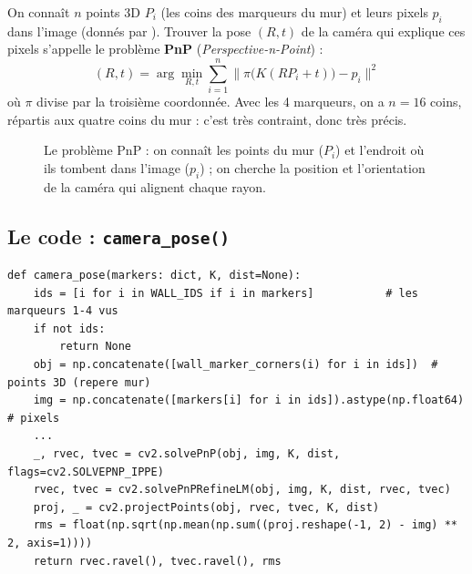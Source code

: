\documentclass[11pt,a4paper]{article}
\newcommand{\code}[1]{\texttt{\detokenize{#1}}}
\begin{document}
On connaît $n$ points 3D $P_i$ (les coins des marqueurs du mur) et leurs pixels $p_i$ dans l'image (donnés par
\code{detect()}). Trouver la pose $(R,t)$ de la caméra qui explique ces pixels s'appelle le problème
\textbf{PnP} (\emph{Perspective-n-Point}) :
\[
  (R, t) = \arg\min_{R,t} \sum_{i=1}^{n} \bigl\| \pi\bigl(K (R P_i + t)\bigr) - p_i \bigr\|^2
\]
où $\pi$ divise par la troisième coordonnée. Avec les 4 marqueurs, on a $n = 16$ coins, répartis aux quatre
coins du mur : c'est très contraint, donc très précis.

\begin{figure}[H]
\centering
{}
\caption{Le problème PnP : on connaît les points du mur ($P_i$) et l'endroit où ils tombent dans l'image
($p_i$) ; on cherche la position et l'orientation de la caméra qui alignent chaque rayon.}
\end{figure}

\subsection{Le code : \texttt{camera\_pose()}}

\begin{lstlisting}[style=py]
def camera_pose(markers: dict, K, dist=None):
    ids = [i for i in WALL_IDS if i in markers]           # les marqueurs 1-4 vus
    if not ids:
        return None
    obj = np.concatenate([wall_marker_corners(i) for i in ids])  # points 3D (repere mur)
    img = np.concatenate([markers[i] for i in ids]).astype(np.float64)  # pixels
    ...
    _, rvec, tvec = cv2.solvePnP(obj, img, K, dist, flags=cv2.SOLVEPNP_IPPE)
    rvec, tvec = cv2.solvePnPRefineLM(obj, img, K, dist, rvec, tvec)
    proj, _ = cv2.projectPoints(obj, rvec, tvec, K, dist)
    rms = float(np.sqrt(np.mean(np.sum((proj.reshape(-1, 2) - img) ** 2, axis=1))))
    return rvec.ravel(), tvec.ravel(), rms
\end{lstlisting}
\end{document}
